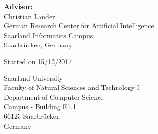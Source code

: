 \pagestyle{empty}

\vspace*{0.5cm}
\textbf{Advisor:}\\
Christian Lander\\
German Research Center for Artificial Intelligence\\
Saarland Informatics Campus\\
Saarbrücken, Germany

\vspace{4.5cm}
Started on 15/12/2017\\


\vspace{4.5cm}


\vspace{3cm}
Saarland University\\
Faculty of Natural Sciences and Technology I\\
Department of Computer Science\\
Campus - Building E1.1\\
66123 Saarbrücken\\
Germany\\



